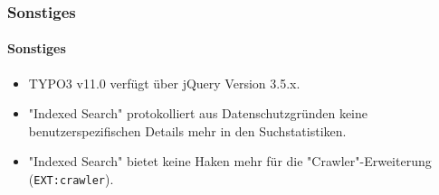 %

\begin{frame}[fragile]
	\frametitle{Sonstiges}
	\framesubtitle{Sonstiges}

	\begin{itemize}
		\item TYPO3 v11.0 verfügt über jQuery Version 3.5.x.
		\item "Indexed Search" protokolliert aus Datenschutzgründen keine benutzerspezifischen
			Details mehr in den Suchstatistiken.
		\item "Indexed Search" bietet keine Haken mehr für die "Crawler"-Erweiterung
			(\small\texttt{EXT:crawler}\normalsize).
	\end{itemize}

\end{frame}

